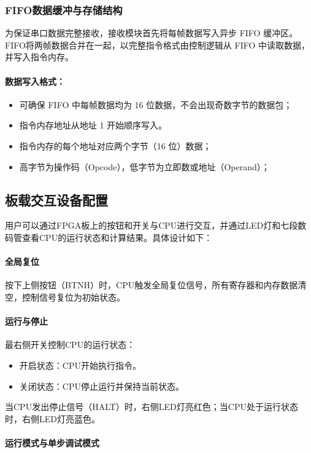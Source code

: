 \documentclass[lang=cn,a4paper,newtx]{elegantpaper}
\begin{document}
\subsubsection{FIFO数据缓冲与存储结构}

为保证串口数据完整接收，接收模块首先将每帧数据写入异步 FIFO 缓冲区。FIFO将两帧数据合并在一起，以完整指令格式由控制逻辑从 FIFO 中读取数据，并写入指令内存。

\paragraph{数据写入格式：}

\begin{itemize}
  \item 可确保 FIFO 中每帧数据均为 16 位数据，不会出现奇数字节的数据包；
  \item 指令内存地址从地址 1 开始顺序写入。
  \item 指令内存的每个地址对应两个字节（16 位）数据；
  \item 高字节为操作码（Opcode），低字节为立即数或地址（Operand）；
\end{itemize}



\subsection{板载交互设备配置}\label{sec:interaction}
用户可以通过FPGA板上的按钮和开关与CPU进行交互，并通过LED灯和七段数码管查看CPU的运行状态和计算结果。具体设计如下：
\paragraph{全局复位}

按下上侧按钮（BTNH）时，CPU触发全局复位信号，所有寄存器和内存数据清空，控制信号复位为初始状态。

\paragraph{运行与停止}

最右侧开关控制CPU的运行状态：
\begin{itemize}
  \item 开启状态：CPU开始执行指令。
  \item 关闭状态：CPU停止运行并保持当前状态。
\end{itemize}
当CPU发出停止信号（HALT）时，右侧LED灯亮红色；当CPU处于运行状态时，右侧LED灯亮蓝色。

\paragraph{运行模式与单步调试模式}
\end{document}
